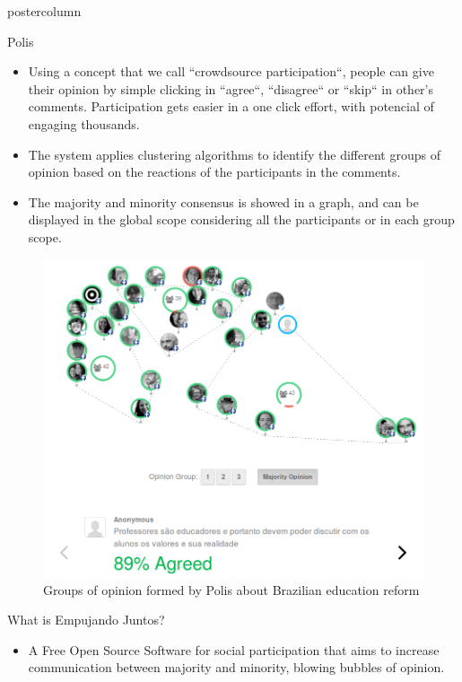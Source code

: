 \documentclass[final,hyperref={pdfpagelabels=false}]{beamer}
\begin{document}
\begin{frame}
\begin{columns}
\begin{column}{.49\textwidth}
\begin{beamercolorbox}[center,wd=\textwidth]{postercolumn}
\begin{minipage}[T]{.95\textwidth}
{\begin{block}{Polis}
\begin{itemize}
    \item Using a concept that we call ``crowdsource participation``, people can
    give their opinion by simple clicking in ``agree``, ``disagree`` or ``skip``
    in other's comments. Participation gets easier in a one click effort, with
    potencial of engaging thousands.

    \item The system applies clustering algorithms to identify the different groups
    of opinion based on the reactions of the participants in the comments.

    \item The majority and minority consensus is showed in a graph, and can be
    displayed in the global scope considering all the participants or in each group
    scope.
  \end{itemize}

  \begin{figure}
    \begin{center}
      \includegraphics[scale=1.1]{../images/polis3.png}
      \caption{Groups of opinion formed by Polis about Brazilian education reform}
      \label{fig:group-clusters}
    \end{center}
  \end{figure}
\end{block}

\begin{block}{What is Empujando Juntos?}

  \begin{itemize}
    \item A Free Open Source Software for social participation that aims to
    increase communication between majority and minority, blowing bubbles of
    opinion.


\end{itemize}
\end{block}}
\end{minipage}
\end{beamercolorbox}
\end{column}
\end{columns}
\end{frame}
\end{document}
